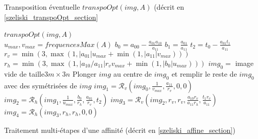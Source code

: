    \begin{algorithme}
    \caption{Transposition éventuelle $transpoOpt(img,A)$ (décrit en \ref{szeliski_transpoOpt_section}}
    \label{szeliski_transpoOpt}
   \end{algorithme}
  
   \begin{algorithme}
    $transpoOpt(img,A)$\;\ \\
    $u_{max}, v_{max} = frequencesMax(A)$\;
	$b_0 = a_{00}-\frac{a_{01}a_{10}}{a_{11}}$\;
	$b_1 = \frac{a_{01}}{a_{11}}$\;
	$t_2 = t_0 - \frac{a_{01}t_1}{a_{11}}$\;
	$r_v = \min(3,\max (1,|a_{01}|u_{max}+\min (1,|a_{11}|v_{max})))$\;
	$r_h = \min(3,\max (1,|a_{10}/a_{11}|r_vv_{max}+\min (1,|b_0|u_{max})))$\;
	$img_0 =$ image vide de taille$3m \times 3n$\;
	Plonger $img$ au centre de $img_0$ et remplir le reste de $img_0$ avec des symétrisées de $img$\;
	$img_1 = \mathcal{R}_v(img_0,\frac{1}{v_{max}},\frac{a_{11}}{r_v},0,0)$\;
	$img_2 = \mathcal{R}_h(img_1,\frac{1}{u_{max}},\frac{b_0}{r_h},\frac{a_{01}}{r_v},t_2)$\;
	$img_3 = \mathcal{R}_v(img_2,r_v,r_v,\frac{a_{10}r_v}{a_{11}r_h},\frac{t_1r_v}{a_{11}})$\;
	$img_4 = \mathcal{R}_h(img_3,r_h,r_h,0,0)$\;
    \caption{Traitement multi-étapes d'une affinité (décrit en \ref{szeliski_affine_section})}
    \label{szeliski_affine}
   \end{algorithme}










